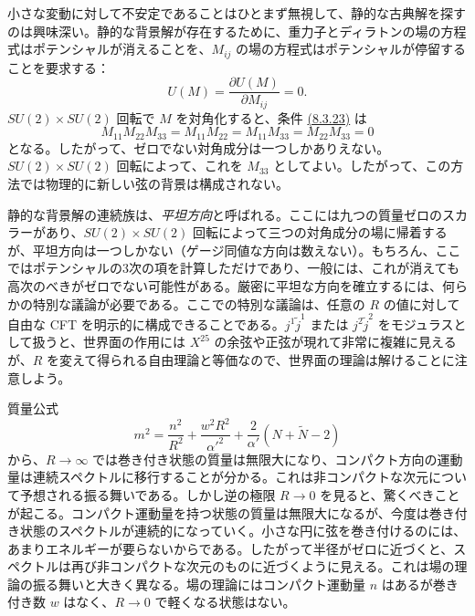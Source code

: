 小さな変動に対して不安定であることはひとまず無視して、静的な古典解を探すのは興味深い。静的な背景解が存在するために、重力子とディラトンの場の方程式はポテンシャルが消えることを、$M_{ij}$ の場の方程式はポテンシャルが停留することを要求する：
\begin{equation}
U(M)=\frac{\partial U(M)}{\partial M_{ij}}=0.
\tag{8.3.23}\label{eq:8.3.23}
\end{equation}
$SU(2)\times SU(2)$ 回転で $M$ を対角化すると、条件 \hyperref[eq:8.3.23]{(8.3.23)} は
\begin{equation}
M_{11}M_{22}M_{33}=M_{11}M_{22}=M_{11}M_{33}=M_{22}M_{33}=0
\tag{8.3.24}\label{eq:8.3.24}
\end{equation}
となる。したがって、ゼロでない対角成分は一つしかありえない。$SU(2)\times SU(2)$ 回転によって、これを $M_{33}$ としてよい。したがって、この方法では物理的に新しい弦の背景は構成されない。

静的な背景解の連続族は、\emph{平坦方向}と呼ばれる。ここには九つの質量ゼロのスカラーがあり、$SU(2)\times SU(2)$ 回転によって三つの対角成分の場に帰着するが、平坦方向は一つしかない（ゲージ同値な方向は数えない）。もちろん、ここではポテンシャルの3次の項を計算しただけであり、一般には、これが消えても高次のべきがゼロでない可能性がある。厳密に平坦な方向を確立するには、何らかの特別な議論が必要である。ここでの特別な議論は、任意の $R$ の値に対して自由な CFT を明示的に構成できることである。$j^1\widetilde j^1$ または $j^2\widetilde j^2$ をモジュラスとして扱うと、世界面の作用には $X^{25}$ の余弦や正弦が現れて非常に複雑に見えるが、$R$ を変えて得られる自由理論と等価なので、世界面の理論は解けることに注意しよう。


質量公式
\begin{equation}
m^2=\frac{n^2}{R^2}+\frac{w^2R^2}{\alpha'^2}+\frac2{\alpha'}(N+\widetilde N-2)
\tag{8.3.25}\label{eq:8.3.25}
\end{equation}
から、$R\to\infty$ では巻き付き状態の質量は無限大になり、コンパクト方向の運動量は連続スペクトルに移行することが分かる。これは非コンパクトな次元について予想される振る舞いである。しかし逆の極限 $R\to0$ を見ると、驚くべきことが起こる。コンパクト運動量を持つ状態の質量は無限大になるが、今度は巻き付き状態のスペクトルが連続的になっていく。小さな円に弦を巻き付けるのには、あまりエネルギーが要らないからである。したがって半径がゼロに近づくと、スペクトルは再び非コンパクトな次元のものに近づくように見える。これは場の理論の振る舞いと大きく異なる。場の理論にはコンパクト運動量 $n$ はあるが巻き付き数 $w$ はなく、$R\to0$ で軽くなる状態はない。

